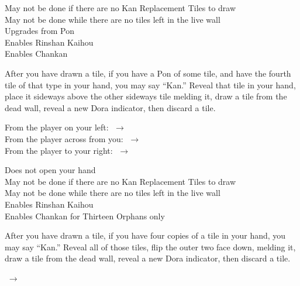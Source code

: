 	{\symbnegate May not be done if there are no Kan Replacement Tiles to draw \\
	\symbnegate May not be done while there are no tiles left in the live wall\\
	\upgradesfrom Upgrades from Pon \\
	\upgradestoother Enables Rinshan Kaihou \\
	\upgradestoother Enables Chankan }
	{After you have drawn a tile, if you have a Pon of some tile, and have the fourth tile of that type in your hand, you may say ``Kan.'' Reveal that tile in your hand, place it sideways above the other sideways tile melding it, draw a tile from the dead wall, reveal a new Dora indicator, then discard a tile.
	\begin{center}{From the player on your left: $\;\rightarrow\;$\\ From the player across from you: $\;\rightarrow\;$\\ From the player to your right: $\;\rightarrow\;$}\end{center}}

	{\symbalert Does not open your hand\\
	\symbnegate May not be done if there are no Kan Replacement Tiles to draw \\
	\symbnegate May not be done while there are no tiles left in the live wall\\
	\upgradestoother Enables Rinshan Kaihou \\
	\upgradestoother Enables Chankan for Thirteen Orphans only }
	{After you have drawn a tile, if you have four copies of a tile in your hand, you may say ``Kan.'' Reveal all of those tiles, flip the outer two face down, melding it, draw a tile from the dead wall, reveal a new Dora indicator, then discard a tile.
	\begin{center}{$\;\rightarrow\;$}\end{center}}